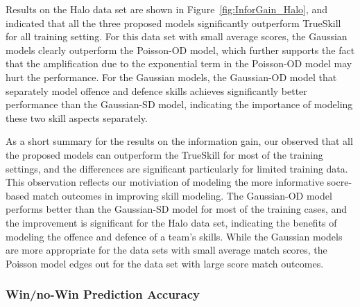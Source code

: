 \begin{center}
\begin{figure*}[htbp!]
 \centering
\caption{\small Results on the AFL data set, evaluated
using information gain. Error bars indicate
95\% confidence intervals.}
\label{fig:InforGain_AFL}
\end{figure*}
\end{center}

Results on the Halo data set are shown in Figure~\ref{fig:InforGain_Halo}, and indicated that all the three proposed models significantly outperform TrueSkill for all training setting. For this data set with small average scores, the Gaussian models clearly outperform the Poisson-OD model, which further supports the fact that the amplification due to the exponential term in the Poisson-OD model may hurt the performance. For the Gaussian models, the Gaussian-OD model that separately model offence and defence skills achieves significantly better performance than the Gaussian-SD model, indicating the importance of modeling these two skill aspects separately. 

\begin{center}
\begin{figure*}[t!]
 \centering
\caption{\small Results on the Halo 2 data set, evaluated
using information gain. Error bars indicate
95\% confidence intervals.}
\label{fig:InforGain_Halo}
\end{figure*}
\end{center}

As a short summary for the results on the information gain, our observed that all the proposed models can outperform the TrueSkill for most of the training settings, and the differences are significant particularly for limited training data. This observation reflects our motiviation of modeling the more informative socre-based match outcomes in improving skill modeling. The Gaussian-OD model performs better than the Gaussian-SD model for most of the training cases, and the improvement is significant for the Halo data set, indicating the benefits of modeling the offence and defence of a team's skills. While the Gaussian models are more appropriate for the data sets with small average match scores, the Poisson model edges out for the data set with large score match outcomes. 

\subsubsection{Win/no-Win Prediction Accuracy }

